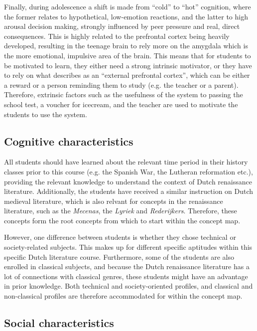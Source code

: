 Finally, during adolescence a shift is made from ``cold'' to ``hot'' cognition, where the former relates to hypothetical, low-emotion reactions, and the latter to high arousal decision making, strongly influenced by peer pressure and real, direct consequences. This is highly related to the prefrontal cortex being heavily developed, resulting in the teenage brain to rely more on the amygdala which is the more emotional, impulsive area of the brain. This means that for students to be motivated to learn, they either need a strong intrinsic motivator, or they have to rely on what  describes as an ``external prefrontal cortex'', which can be either a reward or a person reminding them to study (e.g. the teacher or a parent). Therefore, extrinsic factors such as the usefulness of the system to passing the school test, a voucher for icecream, and the teacher are used to motivate the students to use the system.

\subsection{Cognitive characteristics}

All students should have learned about the relevant time period in their history classes prior to this course (e.g. the Spanish War, the Lutheran reformation etc.), providing the relevant knowledge to understand the context of Dutch renaissance literature. Additionally, the students have received a similar instruction on Dutch medieval literature, which is also relvant for concepts in the renaissance literature, such as the \emph{Mecenas}, the \emph{Lyriek} and \emph{Rederijkers}. Therefore, these concepts form the root concepts from which to start within the concept map.

However, one difference between students is whether they chose technical or society-related subjects. This makes up for different specific aptitudes within this specific Dutch literature course. Furthermore, some of the students are also enrolled in classical subjects, and because the Dutch renaissance literature has a lot of connections with classical genres, these students might have an advantage in prior knowledge. Both technical and society-oriented profiles, and classical and non-classical profiles are therefore accommodated for within the concept map.

\subsection{Social characteristics}

